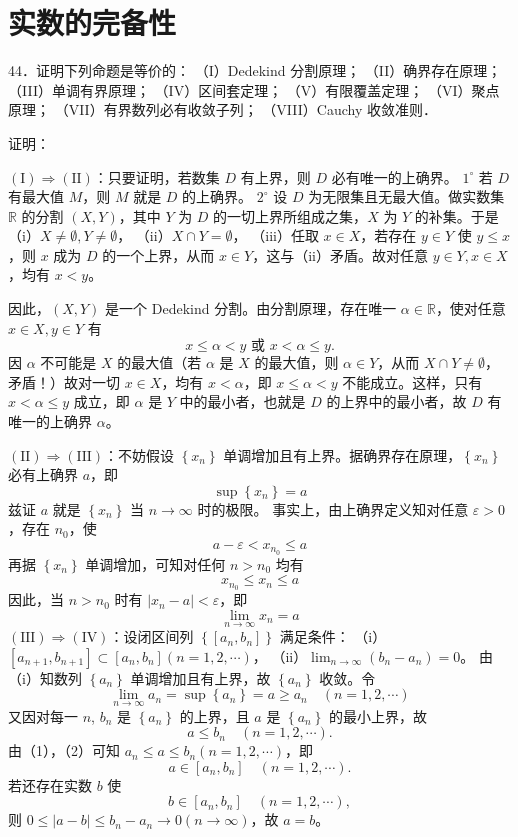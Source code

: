 \section{实数的完备性}

44．证明下列命题是等价的：
（I）Dedekind 分割原理；
（II）确界存在原理；
（III）单调有界原理；
（IV）区间套定理；
（V）有限覆盖定理；
（VI）聚点原理；
（VII）有界数列必有收敛子列；
（VIII）Cauchy 收敛准则．

证明：

$(\mathrm{I}) \Rightarrow(\mathrm{II})$：只要证明，若数集 $D$ 有上界，则 $D$ 必有唯一的上确界。
$1^{\circ}$ 若 $D$ 有最大值 $M$，则 $M$ 就是 $D$ 的上确界。
$2^{\circ}$ 设 $D$ 为无限集且无最大值。做实数集 $\mathbb{R}$ 的分割 $(X, Y)$，其中 $Y$ 为 $D$ 的一切上界所组成之集，$X$ 为 $Y$ 的补集。于是
（i）$X \neq \emptyset, Y \neq \emptyset$，
（ii）$X \cap Y=\emptyset$，
（iii）任取 $x \in X$，若存在 $y \in Y$ 使 $y \leqslant x$，则 $x$ 成为 $D$ 的一个上界，从而 $x \in Y$，这与（ii）矛盾。故对任意 $y \in Y, x \in X$，均有 $x<y$。

因此，$(X, Y)$ 是一个 Dedekind 分割。由分割原理，存在唯一 $\alpha \in \mathbb{R}$，使对任意 $x \in X, y \in Y$ 有
\[
x \leqslant \alpha<y \text { 或 } x<\alpha \leqslant y \text{.}
\]
因 $\alpha$ 不可能是 $X$ 的最大值（若 $\alpha$ 是 $X$ 的最大值，则 $\alpha \in Y$，从而 $X \cap Y \neq \emptyset$，矛盾！）故对一切 $x \in X$，均有 $x<\alpha$，即 $x \leqslant \alpha<y$ 不能成立。这样，只有 $x<\alpha \leqslant y$ 成立，即 $\alpha$ 是 $Y$ 中的最小者，也就是 $D$ 的上界中的最小者，故 $D$ 有唯一的上确界 $\alpha$。

$(\mathrm{II}) \Rightarrow(\mathrm{III})$：不妨假设 $\left\{x_n\right\}$ 单调增加且有上界。据确界存在原理，$\left\{x_n\right\}$ 必有上确界 $a$，即
\[
\sup \left\{x_n\right\}=a
\]
兹证 $a$ 就是 $\left\{x_n\right\}$ 当 $n \rightarrow \infty$ 时的极限。
事实上，由上确界定义知对任意 $\varepsilon>0$，存在 $n_0$，使
\[
a-\varepsilon<x_{n_0} \leqslant a
\]
再据 $\left\{x_n\right\}$ 单调增加，可知对任何 $n>n_0$ 均有
\[
x_{n_0} \leqslant x_n \leqslant a
\]
因此，当 $n>n_0$ 时有 $\left|x_n-a\right|<\varepsilon$，即
\[
\lim_{n \rightarrow \infty} x_n=a
\]
$(\mathrm{III}) \Rightarrow(\mathrm{IV})$：设闭区间列 $\left\{\left[a_n, b_n\right]\right\}$ 满足条件：
（i）$\left[a_{n+1}, b_{n+1}\right] \subset\left[a_n, b_n\right](n=1,2, \cdots)$，
（ii）$\lim_{n \rightarrow \infty}\left(b_n-a_n\right)=0$。
由（i）知数列 $\left\{a_n\right\}$ 单调增加且有上界，故 $\left\{a_n\right\}$ 收敛。令
\[
\lim_{n \rightarrow \infty} a_n=\sup \left\{a_n\right\}=a \geqslant a_n \quad(n=1,2, \cdots)
\]
又因对每一 $n$, $b_n$ 是 $\left\{a_n\right\}$ 的上界，且 $a$ 是 $\left\{a_n\right\}$ 的最小上界，故
\[
a \leqslant b_n \quad(n=1,2, \cdots).
\]
由（1），（2）可知 $a_n \leqslant a \leqslant b_n(n=1,2, \cdots)$，即
\[
a \in\left[a_n, b_n\right] \quad(n=1,2, \cdots).
\]
若还存在实数 $b$ 使
\[
b \in\left[a_n, b_n\right] \quad(n=1,2, \cdots),
\]
则 $0 \leqslant|a-b| \leqslant b_n-a_n \rightarrow 0(n \rightarrow \infty)$，故 $a=b$。

